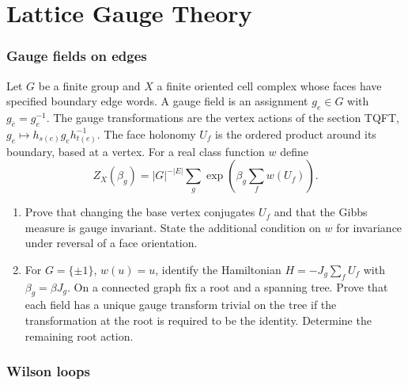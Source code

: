 \part{Lattice Gauge Theory}

\section{Gauge fields on edges}

\begin{exercise}
Let $G$ be a finite group and $X$ a finite oriented cell complex
whose faces have specified boundary edge words. A gauge field is
an assignment $g_e\in G$ with $g_{\bar e}=g_e^{-1}$.
The gauge transformations are the vertex actions of the section
TQFT, $g_e\mapsto h_{s(e)}g_eh_{t(e)}^{-1}$. The face holonomy
$U_f$ is the ordered product around its boundary, based at a vertex.
For a real class function $w$ define
\[
 Z_X(\beta_g)=|G|^{-|E|}\sum_g
       \exp\left(\beta_g\sum_f w(U_f)\right).
\]
\begin{enumerate}[label=(\alph*)]
\item Prove that changing the base vertex conjugates $U_f$ and
that the Gibbs measure is gauge invariant. State the additional
condition on $w$ for invariance under reversal of a face orientation.
\item For $G=\{\pm1\}$, $w(u)=u$, identify the Hamiltonian
$H=-J_g\sum_f U_f$ with $\beta_g=\beta J_g$.
On a connected graph fix a root and a spanning tree. Prove that
each field has a unique gauge transform trivial on the tree
if the transformation at the root is required to be the identity.
Determine the remaining root action.
\end{enumerate}
\end{exercise}

\section{Wilson loops}


